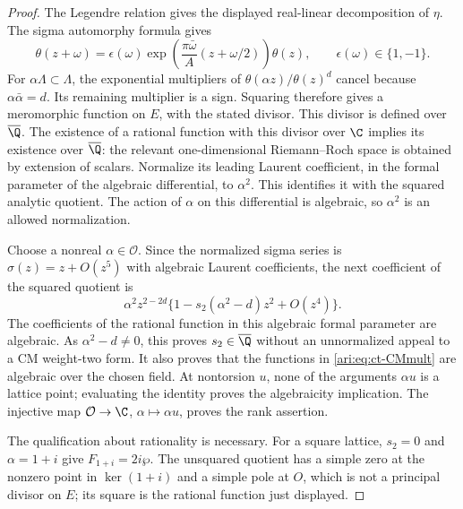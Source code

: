 \begin{proof}
The Legendre relation gives the displayed real-linear decomposition
of $\eta$. The sigma automorphy formula gives
\[
 \theta(z+\omega)=\epsilon(\omega)
  \exp\left(\frac{\pi\bar\omega}{A}
                         (z+\omega/2)\right)\theta(z),
 \qquad \epsilon(\omega)\in\{1,-1\}.
\]
For $\alpha\Lambda\subset\Lambda$, the exponential multipliers
of $\theta(\alpha z)/\theta(z)^d$ cancel because
$\alpha\bar\alpha=d$. Its remaining multiplier is a sign.
Squaring therefore gives a meromorphic function on $E$, with the
stated divisor. This divisor is defined over $\overline{\Q}$.
The existence of a rational function with this divisor over $\C$
implies its existence over $\overline{\Q}$: the relevant
one-dimensional Riemann--Roch space is obtained by extension of
scalars. Normalize its leading Laurent coefficient, in the formal
parameter of the algebraic differential, to $\alpha^2$. This
identifies it with the squared analytic quotient. The action of
$\alpha$ on this differential is algebraic, so $\alpha^2$ is an
allowed normalization.

Choose a nonreal $\alpha\in\mathcal O$. Since the normalized
sigma series is $\sigma(z)=z+O(z^5)$ with algebraic Laurent
coefficients, the next coefficient of the squared quotient is
\[
 \alpha^2z^{2-2d}
       \{1-s_2(\alpha^2-d)z^2+O(z^4)\}.
\]
The coefficients of the rational function in this algebraic formal
parameter are algebraic. As $\alpha^2-d\ne0$, this proves
$s_2\in\overline{\Q}$ without an unnormalized appeal to a CM
weight-two form. It also proves that the functions in
\eqref{ari:eq:ct-CMmult} are algebraic over the chosen field.
At nontorsion $u$, none of the arguments $\alpha u$ is a lattice
point; evaluating the identity proves the algebraicity implication.
The injective map $\mathcal O\to\C$, $\alpha\mapsto\alpha u$,
proves the rank assertion.

The qualification about rationality is necessary. For a square
lattice, $s_2=0$ and $\alpha=1+i$ give
$F_{1+i}=2i\wp$. The unsquared quotient has a simple zero at
the nonzero point in $\ker(1+i)$ and a simple pole at $O$,
which is not a principal divisor on $E$; its square is the
rational function just displayed.
\end{proof}

